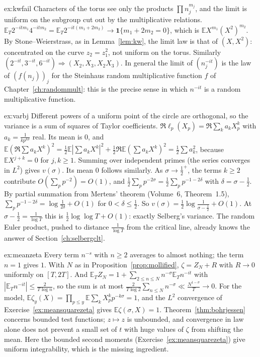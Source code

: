 \begin{solution}{ex:kwfail}
\idea Characters of the torus see only the products $\prod n_j^{m_j}$, and the limit is uniform on the subgroup cut out by the multiplicative relations.
\writeup $\mathbb E_T2^{-itm_1}4^{-itm_2}=\mathbb E_T2^{-it(m_1+2m_2)}\to\mathbf 1\{m_1+2m_2=0\}$, which is $\mathbb EX^{m_1}(X^2)^{m_2}$. By Stone--Weierstrass, as in Lemma~\ref{lem:kw}, the limit law is that of $(X,X^2)$: concentrated on the curve $z_2=z_1^2$, not uniform on the torus. Similarly $(2^{-it},3^{-it},6^{-it})\Rightarrow(X_2,X_3,X_2X_3)$. In general the limit of $(n_j^{-it})$ is the law of $(f(n_j))_j$ for the Steinhaus random multiplicative function $f$ of Chapter~\ref{ch:randommult}: this is the precise sense in which $n^{-it}$ is a random multiplicative function.
\end{solution}

\begin{solution}{ex:varbj}
\idea Different powers of a uniform point of the circle are orthogonal, so the variance is a sum of squares of Taylor coefficients.
\writeup $\Re\ell_p(X_p)=\Re\sum_ka_kX_p^k$ with $a_k=\frac1{kp^{k\sigma}}$ real. Its mean is $0$, and $\mathbb E(\Re\sum a_kX^k)^2=\frac12\mathbb E|\sum a_kX^k|^2+\frac12\Re\mathbb E(\sum a_kX^k)^2=\frac12\sum a_k^2$, because $\mathbb EX^{j+k}=0$ for $j,k\ge1$. Summing over independent primes (the series converges in $L^2$) gives $v(\sigma)$. Its mean $0$ follows similarly. As $\sigma\to\frac12^+$, the terms $k\ge2$ contribute $O(\sum_pp^{-2})=O(1)$, and $\frac12\sum_pp^{-2\sigma}=\frac12\sum_pp^{-1-2\delta}$ with $\delta=\sigma-\frac12$. By partial summation from Mertens' theorem (Volume~6, Theorem~1.5), $\sum_pp^{-1-2\delta}=\log\frac1{2\delta}+O(1)$ for $0<\delta\le\frac12$. So $v(\sigma)=\frac12\log\frac1{\sigma-\frac12}+O(1)$. At $\sigma-\frac12=\frac1{\log T}$ this is $\frac12\log\log T+O(1)$: exactly Selberg's variance. The random Euler product, pushed to distance $\frac1{\log T}$ from the critical line, already knows the answer of Section~\ref{ch:selbergclt}.
\end{solution}

\begin{solution}{ex:meanzeta}
\idea Every term $n^{-s}$ with $n\ge2$ averages to almost nothing; the term $n=1$ gives $1$.
\writeup With $N$ as in Proposition~\ref{prop:mollified}, $\zeta=Z_N+R$ with $R\to0$ uniformly on $[T,2T]$. And $\mathbb E_TZ_N=1+\sum_{2\le n\le N}n^{-\sigma}\mathbb E_Tn^{-it}$ with $|\mathbb E_Tn^{-it}|\le\frac2{T\log n}$, so the sum is at most $\frac2{T\log2}\sum_{n\le N}n^{-\sigma}\ll\frac{N^{1-\sigma}}T\to0$. For the model, $\mathbb E\zeta_y(X)=\prod_{p\le y}\mathbb E\sum_kX_p^kp^{-k\sigma}=1$, and the $L^2$ convergence of Exercise~\ref{ex:meansquarezeta} gives $\mathbb E\zeta(\sigma,X)=1$. Theorem~\ref{thm:bohrjessen} concerns bounded test functions; $z\mapsto z$ is unbounded, and convergence in law alone does not prevent a small set of $t$ with huge values of $\zeta$ from shifting the mean. Here the bounded second moments (Exercise~\ref{ex:meansquarezeta}) give uniform integrability, which is the missing ingredient.
\end{solution}

